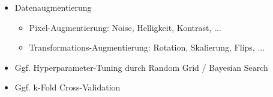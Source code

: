 \begin{enumerate}
\begin{itemize}
        \item Datenaugmentierung
        \begin{itemize}
            \item Pixel-Augmentierung: Noise, Helligkeit, Kontrast, ...
            \item Transformations-Augmentierung: Rotation, Skalierung, Flips, ...
        \end{itemize}

        \item Ggf. Hyperparameter-Tuning durch Random Grid / Bayesian Search
        \item Ggf. k-Fold Cross-Validation
    \end{itemize}

\end{enumerate}
\fi
